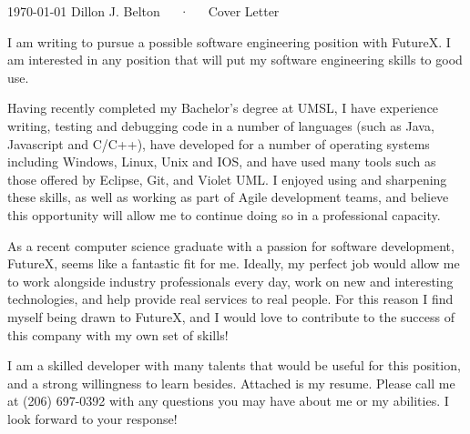\documentclass[11pt, a4paper]{awesome-cv}
\newcommand{\companyname}{FutureX}
\begin{document}
\makecvheader

\makecvfooter
  {\today}
  {Dillon J. Belton~~~·~~~Cover Letter}
  {}

\makelettertitle

\begin{cvletter}

I am writing to pursue a possible software engineering position with \companyname. I am interested in any position that will put my software engineering skills to good use.

Having recently completed my Bachelor's degree at UMSL, I have experience writing, testing and debugging code in a number of languages (such as Java, Javascript and C/C++), have developed for a number of operating systems including Windows, Linux, Unix and IOS, and have used many tools such as those offered by Eclipse, Git, and Violet UML. I enjoyed using and sharpening these skills, as well as working as part of Agile development teams, and believe this opportunity will allow me to continue doing so in a professional capacity.

\lettersection{Why \companyname?}
As a recent computer science graduate with a passion for software development, \companyname, seems like a fantastic fit for me. Ideally, my perfect job would allow me to work alongside industry professionals every day, work on new and interesting technologies, and help provide real services to real people. For this reason I find myself being drawn to \companyname, and I would love to contribute to the success of this company with my own set of skills!

I am a skilled developer with many talents that would be useful for this position, and a strong willingness to learn besides.
Attached is my resume. Please call me at (206) 697-0392 with any questions you may have about me or my abilities. I look forward to your response!

\end{cvletter}


\makeletterclosing
\end{document}
